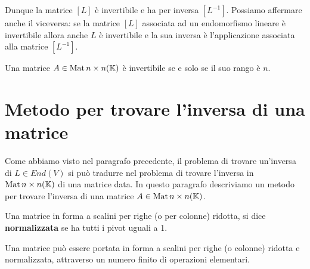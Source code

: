 Dunque la matrice $[L]$ è invertibile e ha per inversa $[L^{-1}]$.
Possiamo affermare anche il viceversa: se la matrice $[L]$ associata ad un
endomorfismo lineare è invertibile allora anche $L$ è invertibile e la sua
inversa è l'applicazione associata alla matrice $[L^{-1}]$.

\begin{corollary}
	Una matrice $A \in \operatorname{Mat}{n \times n}(\mathbb{K})$ è invertibile se e solo se
	il suo rango è $n$.
\end{corollary}

\section{Metodo per trovare l'inversa di una matrice}
Come abbiamo visto nel paragrafo precedente, il problema di trovare un'inversa
di $L \in End(V)$ si può tradurre nel problema di trovare l'inversa in
$\operatorname{Mat}{n \times n}(\mathbb{K})$ di una matrice data. In questo paragrafo descriviamo
un metodo per trovare l'inversa di una matrice $A \in \operatorname{Mat}{n \times n}(\mathbb{K})$.

\begin{definition}
	Una matrice in forma a scalini per righe (o per colonne) ridotta, si dice
	\textbf{normalizzata} se ha tutti i pivot uguali a 1.
\end{definition}

\begin{observation}
	Una matrice può essere portata in forma a scalini per righe (o colonne)
	ridotta e normalizzata, attraverso un numero finito di operazioni elementari.
\end{observation}

